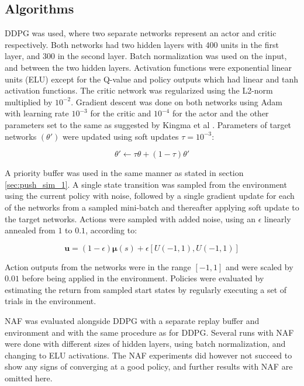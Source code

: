 \subsection{Algorithms}

DDPG was used, where two separate networks represent an actor and critic
respectively. Both networks had two hidden layers with 400 units in the first
layer, and 300 in the second layer. Batch normalization was used on the input,
and between the two hidden layers. Activation functions were exponential linear
units (ELU) except for the Q-value and policy outputs which had linear and tanh
activation functions. The critic network was regularized using the L2-norm
multiplied by $10^{-2}$. Gradient descent was done on both networks using Adam
with learning rate $10^{-3}$ for the critic and $10^{-4}$ for the actor and the
other parameters set to the same as suggested by Kingma et al
\cite{kingma2014adam}. Parameters of target networks $(\theta')$ were updated
using soft updates $\tau = 10^{-3}$:

\begin{equation}
    \theta' \leftarrow \tau \theta + (1 - \tau) \theta'
\end{equation}

A priority buffer was used in the same manner as stated in section
\ref{sec:push_sim_1}. A single state transition was sampled from the
environment using the current policy with noise, followed by a single gradient
update for each of the networks from a sampled mini-batch and thereafter
applying soft update to the target networks. Actions were sampled with added
noise, using an $\epsilon$ linearly annealed from $1$ to $0.1$, according to:

\begin{equation}
    \mathbf{u} = (1 - \epsilon) \mathbf{\mu}(s) + \epsilon \left[U(-1, 1), U(-1, 1)\right]
\end{equation}

Action outputs from the networks were in the range $[-1, 1]$ and were scaled by
$0.01$ before being applied in the environment. Policies were evaluated by
estimating the return from sampled start states by regularly executing a set of
trials in the environment.

NAF was evaluated alongside DDPG with a separate replay buffer and environment
and with the same procedure as for DDPG. Several runs with NAF were done with
different sizes of hidden layers, using batch normalization, and changing to
ELU activations. The NAF experiments did however not succeed to show any signs
of converging at a good policy, and further results with NAF are omitted here.

